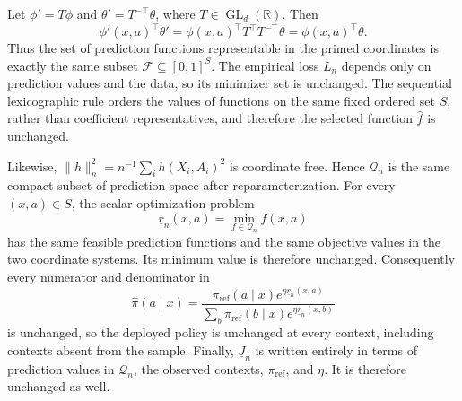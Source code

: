 Let \(\phi'=T\phi\) and \(\theta'=T^{-\top}\theta\), where \(T\in\operatorname{GL}_d(\mathbb R)\). Then
\[
\phi'(x,a)^\top\theta'=\phi(x,a)^\top T^\top T^{-\top}\theta=\phi(x,a)^\top\theta.
\]
Thus the set of prediction functions representable in the primed coordinates is exactly the same subset \(\mathcal F\subseteq[0,1]^S\). The empirical loss \(L_n\) depends only on prediction values and the data, so its minimizer set is unchanged. The sequential lexicographic rule orders the values of functions on the same fixed ordered set \(S\), rather than coefficient representatives, and therefore the selected function \(\widehat f\) is unchanged.

Likewise, \(\|h\|_n^2=n^{-1}\sum_i h(X_i,A_i)^2\) is coordinate free. Hence \(\mathcal Q_n\) is the same compact subset of prediction space after reparameterization. For every \((x,a)\in S\), the scalar optimization problem
\[
\underline r_n(x,a)=\min_{f\in\mathcal Q_n}f(x,a)
\]
has the same feasible prediction functions and the same objective values in the two coordinate systems. Its minimum value is therefore unchanged. Consequently every numerator and denominator in
\[
\widehat\pi(a\mid x)=\frac{\pi_{\mathrm{ref}}(a\mid x)e^{\eta\underline r_n(x,a)}}{\sum_b\pi_{\mathrm{ref}}(b\mid x)e^{\eta\underline r_n(x,b)}}
\]
is unchanged, so the deployed policy is unchanged at every context, including contexts absent from the sample. Finally, \(\underline J_n\) is written entirely in terms of prediction values in \(\mathcal Q_n\), the observed contexts, \(\pi_{\mathrm{ref}}\), and \(\eta\). It is therefore unchanged as well.